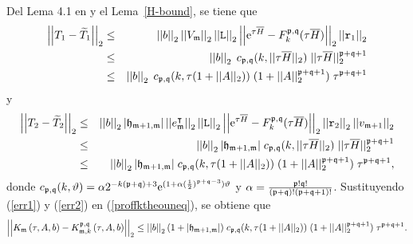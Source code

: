 Del Lema 4.1 en \cite{jimenez2012convergence} y el Lema~\ref{H-bound}, se tiene que
\begin{eqnarray}
\left\lvert\left\lvert T_1 - \widetilde{T}_1\right\rvert\right\rvert_2
&\leq& \left\lvert \left\lvert b \right\rvert \right\rvert_2 \left\lvert\left\lvert  V_{\mathfrak{m}} \right\rvert\right\rvert_2 \left\lvert\left\lvert  \mathtt{L} \right\rvert\right\rvert_2 \left\lvert\left\lvert \mathrm{e}^{\tau  \overline{H}}-F_k^{\mathfrak{p},\mathfrak{q}}(\tau \overline{H}) \right\rvert\right\rvert_2
\left\lvert\left\lvert  \mathtt{r}_1 \right\rvert\right\rvert_2 \nonumber\\
&\leq& \left\lvert \left\lvert b \right\rvert \right\rvert_2 \;  c_{\mathfrak{p},\mathfrak{q}}(k,\lvert\lvert\tau\overline{H}\rvert\rvert_2) \;
\lvert\lvert\tau \overline{H}\rvert\rvert_2^{\mathfrak{p}+\mathfrak{q}+1}\nonumber\\
&\leq& \left\lvert \left\lvert b \right\rvert \right\rvert_2 \; c_{\mathfrak{p},\mathfrak{q}}(k,\tau (1+\lvert\lvert A \rvert\rvert_2))
\; (1 + \lvert\lvert A \rvert\rvert_2^{\mathfrak{p}+\mathfrak{q}+1}) \; \tau^{\mathfrak{p}+\mathfrak{q}+1}
\label{err1}
\end{eqnarray}
y
\begin{eqnarray}
\left\lvert\left\lvert T_2 - \widetilde{T}_2 \right\rvert\right\rvert_2
&\leq& \left\lvert \left\lvert b \right\rvert \right\rvert_2 \lvert \mathfrak{h}_{\mathfrak{m}+1,\mathfrak{m}}\rvert \left\lvert\left\lvert  e_{\mathfrak{m}}^\intercal \right\rvert\right\rvert_2 \left\lvert\left\lvert  \mathtt{L} \right\rvert\right\rvert_2 \left\lvert\left\lvert \mathrm{e}^{\tau \overline{H}}-
F_k^{\mathfrak{p},\mathfrak{q}}(\tau \overline{H}) \right\rvert\right\rvert_2  \left\lvert\left\lvert  \mathtt{r}_2 \right\rvert\right\rvert_2 \left\lvert\left\lvert v_{\mathfrak{m}+1}\right\rvert\right\rvert_2 \nonumber\\
&\leq&\left\lvert \left\lvert b \right\rvert \right\rvert_2 \lvert \mathfrak{h}_{\mathfrak{m}+1,\mathfrak{m}}\rvert \; c_{\mathfrak{p},\mathfrak{q}}
(k,\lvert\lvert\tau \overline{H}\rvert\rvert_2) \;
\lvert\lvert\tau \overline{H}\rvert\rvert_2^{\mathfrak{p}+\mathfrak{q}+1}\nonumber\\
&\leq& \left\lvert \left\lvert b \right\rvert \right\rvert_2 \lvert \mathfrak{h}_{\mathfrak{m}+1,\mathfrak{m}}\rvert \; c_{\mathfrak{p},\mathfrak{q}}(k,\tau (1+\lvert\lvert A \rvert\rvert_2))
\; (1 + \lvert\lvert A \rvert\rvert_2^{\mathfrak{p}+\mathfrak{q}+1}) \; \tau^{\mathfrak{p}+\mathfrak{q}+1}\label{err2},
\end{eqnarray}
donde $c_{\mathfrak{p},\mathfrak{q}}(k,\vartheta )=\alpha
2^{-k(\mathfrak{p}+\mathfrak{q})+3}\mathrm{e}^{(1+\alpha(\frac{1}{2})^{\mathfrak{p}+\mathfrak{q}-3})\vartheta }$ y $%
\alpha =\frac{\pf!\qf!}{(\pf+\qf)!(\pf+\qf+1)!}$. Sustituyendo (\ref{err1}) y (\ref{err2}) en (\ref{proffktheouneq}), se obtiene que
\begin{equation}
\left\lvert\left\lvert   K_{\mathfrak{m}}\left( \tau , A , b \right) -
K_{\mathfrak{m},k}^{\mathfrak{p},\mathfrak{q}}\left( \tau, A , b \right) \right\rvert\right\rvert_2
\leq \left\lvert \left\lvert b \right\rvert \right\rvert_2 (1+\lvert\mathfrak{h}_{\mathfrak{m}+1,\mathfrak{m}}\rvert) \; c_{\mathfrak{p},\mathfrak{q}}(k,\tau (1+\lvert\lvert A \rvert\rvert_2))
\; (1 + \lvert\lvert A \rvert\rvert_2^{\mathfrak{p}+\mathfrak{q}+1}) \; \tau^{\mathfrak{p}+\mathfrak{q}+1}. \label{errp1}
\end{equation}

